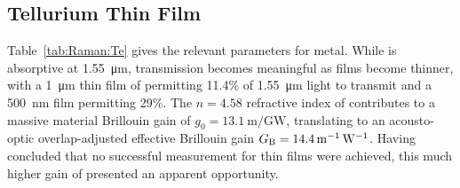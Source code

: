 \subsection{Tellurium Thin Film}
\label{subsec:Raman:Target:Te}

Table~\ref{tab:Raman:Te} gives the relevant parameters for  metal. While  is absorptive at \SI{1.55}{\micro\meter}, transmission becomes meaningful as films become thinner, with a \SI{1}{\micro\meter} thin film of  permitting 11.4\% of \SI{1.55}{\micro\meter} light to transmit and a \SI{500}{\nano\meter} film permitting 29\%. \cite{ciesielski2018permittivity} The \(n = 4.58\) refractive index of  contributes to a massive material Brillouin gain of \(g_{0} = \SI{13.1}{\meter\per\giga\watt}\), translating to an acousto-optic overlap-adjusted effective Brillouin gain \(G_{\rm B} = \SI{14.4}{\per\meter\per\watt}\). Having concluded that no successful measurement for  thin films were achieved, this much higher gain of  presented an apparent opportunity.


